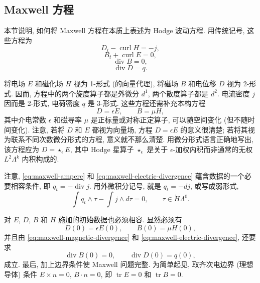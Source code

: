 \subsection{{Maxwell 方程}}\label{sec:maxwell-equations}

{本节说明, 如何将 Maxwell 方程在本质上表述为 Hodge 波动方程. 用传统记号, 这些方程为}
\begin{equation}\label{eq:maxwell-ampere}D_t-\operatorname{curl}H=-j,\end{equation}
\begin{equation}\label{eq:maxwell-faraday}B_t+\operatorname{curl}E=0,\end{equation}
\begin{equation}\label{eq:maxwell-magnetic-divergence}\operatorname{div}B=0,\end{equation}
\begin{equation}\label{eq:maxwell-electric-divergence}\operatorname{div}D=q.\end{equation}

{将电场 $E$ 和磁化场 $H$ 视为 1-形式 (的向量代理), 将磁场 $B$ 和电位移 $D$ 视为 2-形式. 因而, 方程中的两个旋度算子都是外微分 $d^1$, 两个散度算子都是 $d^2$. 电流密度 $j$ 因而是 2-形式, 电荷密度 $q$ 是 3-形式. 这些方程还需补充本构方程}
\[
D=\epsilon E,\qquad B=\mu H,
\]
{其中介电常数 $\epsilon$ 和磁导率 $\mu$ 是正标量或对称正定算子, 可以随空间变化 (但不随时间变化). 注意, 若将 $D$ 和 $E$ 都视为向量场, 方程 $D=\epsilon E$ 的意义很清楚; 若将其视为联系不同次数微分形式的方程, 意义就不那么清楚. 用微分形式语言正确地写出, 该方程应为 $D=\star_\epsilon E$, 其中 Hodge 星算子 $\star_\epsilon$ 是关于 $\epsilon$-加权内积而非通常的无权 $L^2\Lambda^k$ 内积构成的.}

{注意, \eqref{eq:maxwell-ampere} 和 \eqref{eq:maxwell-electric-divergence} 蕴含数据的一个必要相容条件, 即 $q_t=-\operatorname{div}j$. 用外微积分记号, 就是 $q_t=-dj$, 或写成弱形式,}
\begin{equation}\label{eq:maxwell-data-compatibility}
\int q_t\wedge\tau-\int j\wedge d\tau=0,\qquad\tau\in\mathring H\Lambda^0.
\end{equation}

{对 $E$, $D$, $B$ 和 $H$ 施加的初始数据也必须相容. 显然必须有}
\[
D(0)=\epsilon E(0),\qquad B(0)=\mu H(0),
\]
{并且由 \eqref{eq:maxwell-magnetic-divergence} 和 \eqref{eq:maxwell-electric-divergence}, 还要求}
\[
\operatorname{div}B(0)=0,\qquad\operatorname{div}D(0)=q(0),
\]
{成立. 最后, 加上边界条件使 Maxwell 问题完整. 为简单起见, 取齐次电边界 (理想导体) 条件 $E\times n=0$, $B\cdot n=0$, 即 $\operatorname{tr}E=0$ 和 $\operatorname{tr}B=0$.}

